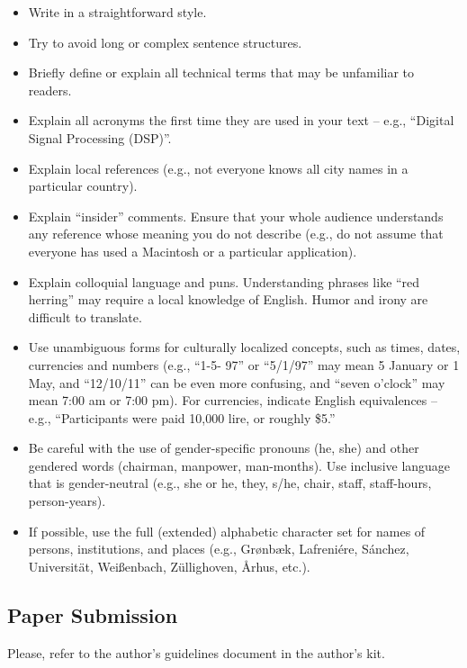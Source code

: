 \documentclass{scspaperproc}
\theoremstyle{scsthe}
\begin{document}
    \begin{itemize}
        \item{Write in a straightforward style.}
        \item{Try to avoid long or complex sentence structures.}
        \item{Briefly define or explain all technical terms that may be unfamiliar to readers.}
        \item{Explain all acronyms the first time they are used in your text – e.g., “Digital Signal Processing (DSP)”.}
        \item{Explain local references (e.g., not everyone knows all city names in a particular country).}
        \item{Explain “insider” comments. Ensure that your whole audience understands any reference whose meaning you do not describe (e.g., do not assume that everyone has used a Macintosh or a particular application).}
        \item{Explain colloquial language and puns. Understanding phrases like “red herring” may require a local knowledge of English. Humor and irony are difficult to translate.}
        \item{Use unambiguous forms for culturally localized concepts, such as times, dates, currencies and numbers (e.g., “1-5- 97” or “5/1/97” may mean 5 January or 1 May, and “12/10/11” can be even more confusing, and “seven o’clock” may mean 7:00 am or 7:00 pm).  For currencies, indicate English equivalences – e.g., “Participants were paid 10,000 lire, or roughly \$5.”}
        \item{Be careful with the use of gender-specific pronouns (he, she) and other gendered words (chairman, manpower, man-months). Use inclusive language that is gender-neutral (e.g., she or he, they, s/he, chair, staff, staff-hours, person-years).}
        \item{If possible, use the full (extended) alphabetic character set for names of persons, institutions, and places (e.g., {Gr\o nb\ae k}, Lafreni\'ere, S\'anchez, Universit\"at, {Wei\ss enbach}, Z\"ullighoven, {\AA rhus}, etc.).}
    \end{itemize}

    \subsection{Paper Submission}

    Please, refer to the author's guidelines document in the author's kit.
\end{document}
